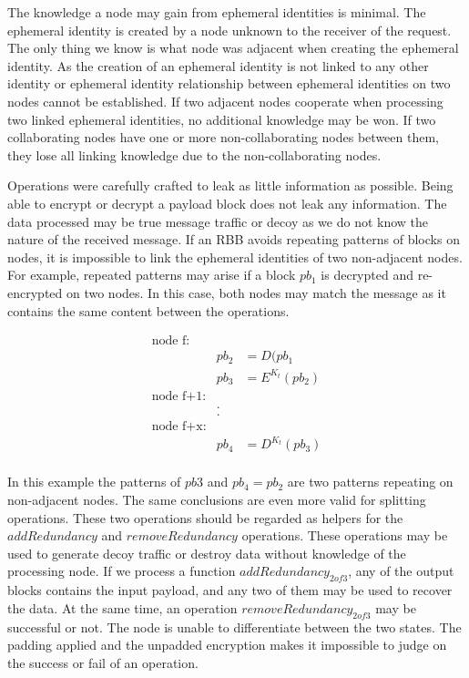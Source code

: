 The knowledge a node may gain from ephemeral identities is minimal. The ephemeral identity is created by a node unknown to the receiver of the request. The only thing we know is what node was adjacent when creating the ephemeral identity. As the creation of an ephemeral identity is not linked to any other identity or ephemeral identity relationship between ephemeral identities on two nodes cannot be established. If two adjacent nodes cooperate when processing two linked ephemeral identities, no additional knowledge may be won. If two collaborating nodes have one or more non-collaborating nodes between them, they lose all linking knowledge due to the non-collaborating nodes. 

Operations were carefully crafted to leak as little information as possible. Being able to encrypt or decrypt a payload block does not leak any information. The data processed may be true message traffic or decoy as we do not know the nature of the received message. If an RBB avoids repeating patterns of blocks on nodes, it is impossible to link the ephemeral identities of two non-adjacent nodes. For example, repeated patterns may arise if a block $pb_1$ is decrypted and re-encrypted on two nodes. In this case, both nodes may match the message as it contains the same content between the operations.

\begin{eqnarray*}
	\text{node f:}\\
	& pb_2 & = D(pb_1\\
	& pb_3 & = E^{K_t}(pb_2)\\
	\text{node f+1:}\\
	&.\\
	&.\\    
	\text{node f+x:}\\
	& pb_4 & = D^{K_t}(pb_3)\\
\end{eqnarray*}

In this example the patterns of $pb3$ and $pb_4=pb_2$ are two patterns repeating on non-adjacent nodes. The same conclusions are even more valid for splitting operations. These two operations should be regarded as helpers for the $addRedundancy$ and $removeRedundancy$ operations. These operations may be used to generate decoy traffic or destroy data without knowledge of the processing node. If we process a function $addRedundancy_{2 of 3}$, any of the output blocks contains the input payload, and any two of them may be used to recover the data. At the same time, an operation $removeRedundancy_{2 of 3}$ may be successful or not. The node is unable to differentiate between the two states. The padding applied and the unpadded encryption makes it impossible to judge on the success or fail of an operation.


